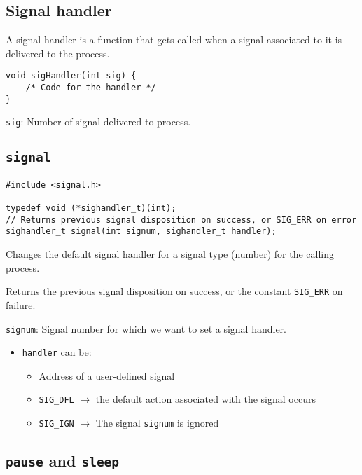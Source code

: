 \documentclass{article}
\begin{document}
\subsection{Signal handler}

A signal handler is a function that gets called when a signal associated to it is delivered to the process.

\begin{verbatim}
void sigHandler(int sig) {
    /* Code for the handler */
}
\end{verbatim}

\texttt{sig}: Number of signal delivered to process.


\subsection{\texttt{signal}}

\begin{verbatim}
#include <signal.h>

typedef void (*sighandler_t)(int);
// Returns previous signal disposition on success, or SIG_ERR on error
sighandler_t signal(int signum, sighandler_t handler);
\end{verbatim}

Changes the default signal handler for a signal type (number) for the calling process.

Returns the previous signal disposition on success, or the constant \texttt{SIG\_ERR} on failure.

\texttt{signum}: Signal number for which we want to set a signal handler.

\begin{itemize}
    \item \texttt{handler} can be:
        \begin{itemize}
            \item Address of a user-defined signal
            \item \texttt{SIG\_DFL} $\rightarrow$ the default action associated with the signal occurs
            \item \texttt{SIG\_IGN} $\rightarrow$ The signal \texttt{signum} is ignored
        \end{itemize}
\end{itemize}


\subsection{\texttt{pause} and \texttt{sleep}}
\end{document}
